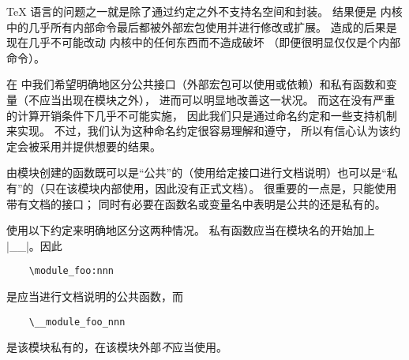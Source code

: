 \documentclass{l3doc}
\begin{document}
\TeX{} 语言的问题之一就是除了通过约定之外不支持名空间和封装。
结果便是 \LaTeXe{} 内核中的几乎所有内部命令最后都被外部宏包使用并进行修改或扩展。
造成的后果是现在几乎不可能改动 \LaTeXe{} 内核中的任何东西而不造成破坏
（即便很明显仅仅是个内部命令）。


在  中我们希望明确地区分公共接口（外部宏包可以使用或依赖）和私有函数和变量（不应当出现在模块之外），
进而可以明显地改善这一状况。
而这在没有严重的计算开销条件下几乎不可能实施，
因此我们只是通过命名约定和一些支持机制来实现。
不过，我们认为这种命名约定很容易理解和遵守，
所以有信心认为该约定会被采用并提供想要的结果。

%
%

由模块创建的函数既可以是“公共”的（使用给定接口进行文档说明）也可以是“私有”的（只在该模块内部使用，因此没有正式文档）。
很重要的一点是，只能使用带有文档的接口；
同时有必要在函数名或变量名中表明是公共的还是私有的。


使用以下约定来明确地区分这两种情况。
私有函数应当在模块名的开始加上 |__|。因此
\begin{verbatim}
    \module_foo:nnn
\end{verbatim}
是应当进行文档说明的公共函数，而
\begin{verbatim}
    \__module_foo_nnn
\end{verbatim}
是该模块私有的，在该模块外部\emph{不}应当使用。
\end{document}
